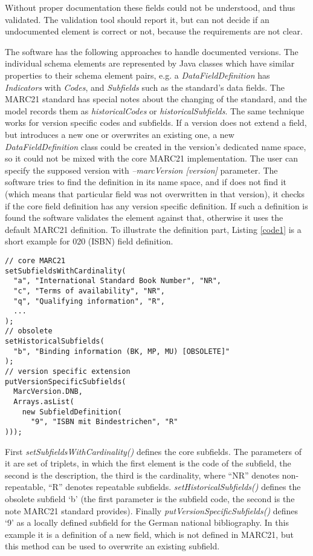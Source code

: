 Without proper documentation these fields could not be understood, and thus validated. The validation tool should report it, but can not decide if an undocumented element is correct or not, because the requirements are not clear.

The software has the following approaches to handle documented versions. The individual schema elements are represented by Java classes which have similar properties to their schema element pairs, e.g. a \emph{DataFieldDefinition} has \emph{Indicators} with \emph{Codes}, and \emph{Subfields} such as the standard's data fields. The MARC21 standard has special notes about the changing of the standard, and the model records them as \emph{historicalCodes} or \emph{historicalSubfields}. The same technique works for version specific codes and subfields. If a version does not extend a field, but introduces a new one or overwrites an existing one, a new \emph{DataFieldDefinition} class could be created in the version's dedicated name space, so it could not be mixed with the core MARC21 implementation. The user can specify the supposed version with \emph{--marcVersion [version]} parameter. The software tries to find the definition in its name space, and if does not find it (which means that particular field was not overwritten in that version), it checks if the core field definition has any version specific definition. If such a definition is found the software validates the element against that, otherwise it uses the default MARC21 definition. To illustrate the definition part, Listing \ref{code1} is a short example for 020 (ISBN) field definition.

\lstset{language=Java, basicstyle=\footnotesize\ttfamily}

\begin{lstlisting}[float, caption=Subfield definition in Java, label=code1]
// core MARC21
setSubfieldsWithCardinality(
  "a", "International Standard Book Number", "NR",
  "c", "Terms of availability", "NR",
  "q", "Qualifying information", "R",
  ...
);
// obsolete
setHistoricalSubfields(
  "b", "Binding information (BK, MP, MU) [OBSOLETE]"
);
// version specific extension
putVersionSpecificSubfields(
  MarcVersion.DNB,
  Arrays.asList(
    new SubfieldDefinition(
      "9", "ISBN mit Bindestrichen", "R"
)));
\end{lstlisting}

First \emph{setSubfieldsWithCardinality()} defines the core subfields. The parameters of it are set of triplets, in which the first element is the code of the subfield, the second is the description, the third is the cardinality, where ``NR'' denotes non-repeatable, ``R'' denotes repeatable subfields. \emph{setHistoricalSubfields()} defines the obsolete subfield `b' (the first parameter is the subfield code, the second is the note MARC21 standard provides). Finally \emph{putVersionSpecificSubfields()} defines `9' as a locally defined subfield for the German national bibliography. In this example it is a definition of a new field, which is not defined in MARC21, but this method can be used to overwrite an existing subfield.

